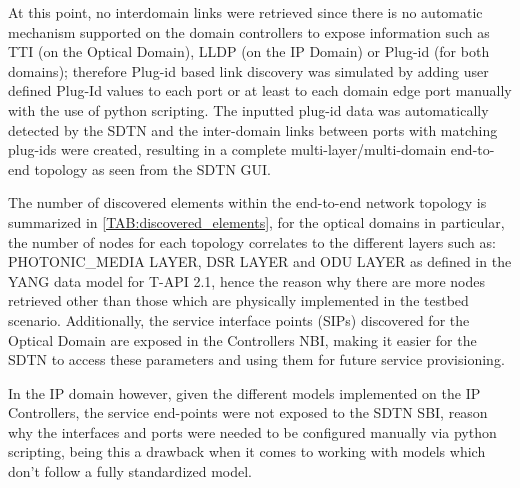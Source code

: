 \documentclass[a4paper,fleqn]{cas-dc}
\begin{document}
At this point, no interdomain links were retrieved since there is no automatic mechanism supported on the domain controllers to expose information such as TTI (on the Optical Domain), LLDP (on the IP Domain) or Plug-id (for both domains); therefore Plug-id based link discovery was simulated by adding user defined Plug-Id values to each port or at least to each domain edge port manually with the use of python scripting. The inputted plug-id data was automatically detected by the SDTN and the inter-domain links between ports with matching plug-ids were created, resulting in a complete multi-layer/multi-domain end-to-end topology as seen from the SDTN GUI.

The number of discovered elements within the end-to-end network topology is summarized in \cref{TAB:discovered_elements}, for the optical domains in particular, the number of nodes for each topology correlates to the different layers such as:
PHOTONIC\_MEDIA LAYER, DSR LAYER and ODU LAYER as defined in the YANG data model for T-API 2.1, hence the reason why there are more nodes retrieved other than those which are physically implemented in the testbed scenario. Additionally, the service interface points (SIPs) discovered for the Optical Domain are exposed in the Controllers NBI, making it easier for the SDTN to access these parameters and using them for future service provisioning. 

In the IP domain however, given the different models implemented on the IP Controllers, the service end-points were not exposed to the SDTN SBI, reason why the interfaces and ports were needed to be configured manually via python scripting, being this a drawback when it comes to working with models which don’t follow a fully standardized model.
\end{document}
